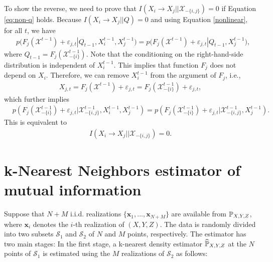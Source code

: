 To show the reverse, we need to prove that $I(X_i\rightarrow X_j||\mathcal{X}_{-\{i,j\}})=0$ if Equation \eqref{eq:non-q} holds.
Because $I(X_i\rightarrow X_j||Q)=0$ and using Equation \eqref{nonlinear}, for all $t$, we have
\begin{align*}
    &p\big(F_{j}(\mathcal{X}^{t-1}) + \varepsilon_{j,t}|Q_{t-1}, X_i^{t-1},X_j^{t-1}\big)=
    p\big(F_{j}(\mathcal{X}^{t-1}) + \varepsilon_{j,t}|Q_{t-1}, X_j^{t-1}\big),
\end{align*}
where $Q_{t-1}=F_{j}(\mathcal{X}_{-\{i\}}^{t-1})$. Note that the conditioning on the right-hand-side distribution is independent of $X_{i}^{t-1}$. This implies that function $F_j$ does not depend on $X_i$. Therefore, we can remove $X_i^{t-1}$ from the argument of $F_j$, i.e., 
\begin{align*}
    X_{j,t}=F_{j}(\mathcal{X}^{t-1})+\varepsilon_{j,t}=F_{j}(\mathcal{X}_{-\{i\}}^{t-1})+\varepsilon_{j,t},
\end{align*} 
which further implies
\begin{align*}
    &p(F_{j}(\mathcal{X}_{-\{i\}}^{t-1}) + \varepsilon_{j,t}|\mathcal{X}_{-\{i,j\}}^{t-1}, X_i^{t-1},X_j^{t-1})=
    p(F_{j}(\mathcal{X}_{-\{i\}}^{t-1}) + \varepsilon_{j,t}|\mathcal{X}_{-\{i,j\}}^{t-1},X_j^{t-1}). 
\end{align*}
This is equivalent to 
\begin{align*}
    I(X_i\rightarrow X_j||\mathcal{X}_{-\{i,j\}})=0.
\end{align*}






\section{k-Nearest Neighbors estimator of mutual information}
Suppose that $N+M$ i.i.d. realizations $\{\textbf{x}_1, ..., \textbf{x}_{N+M}\}$ are available from $\operatorname{{\mathbb{P}}}_{X,Y,Z}$, where $\textbf{x}_i$ denotes the $i$-th realization of $(X,Y,Z)$.
The data is randomly divided into two subsets $\mathcal{S}_1$ and $\mathcal{S}_2$ of $N$ and $M$ points, respectively.  
The estimator has two main stages:
In the first stage, a k-nearest density estimator $\widehat{\operatorname{{\mathbb{P}}}}_{X,Y,Z}$ at the $N$ points of $\mathcal{S}_1$ is estimated using the $M$ realizations of $\mathcal{S}_2$ as follows: 


